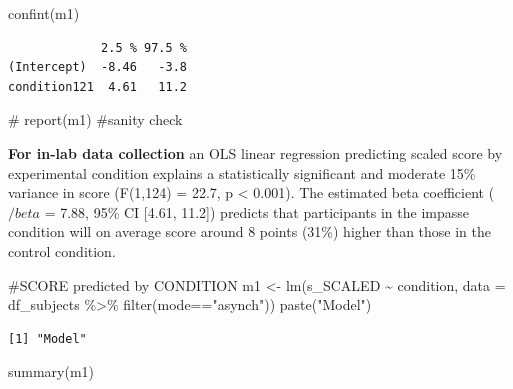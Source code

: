 \documentclass[
  letterpaper,
  DIV=11,
  numbers=noendperiod]{scrreprt}
\newenvironment{Shaded}{\begin{snugshade}}{\end{snugshade}}
\newcommand{\AttributeTok}[1]{\textcolor[rgb]{0.40,0.45,0.13}{#1}}
\newcommand{\CommentTok}[1]{\textcolor[rgb]{0.37,0.37,0.37}{#1}}
\newcommand{\FunctionTok}[1]{\textcolor[rgb]{0.28,0.35,0.67}{#1}}
\newcommand{\NormalTok}[1]{\textcolor[rgb]{0.00,0.23,0.31}{#1}}
\newcommand{\OtherTok}[1]{\textcolor[rgb]{0.00,0.23,0.31}{#1}}
\newcommand{\SpecialCharTok}[1]{\textcolor[rgb]{0.37,0.37,0.37}{#1}}
\newcommand{\StringTok}[1]{\textcolor[rgb]{0.13,0.47,0.30}{#1}}
\begin{document}
\begin{Shaded}
\begin{Highlighting}[]
\FunctionTok{confint}\NormalTok{(m1)}
\end{Highlighting}
\end{Shaded}

\begin{verbatim}
             2.5 % 97.5 %
(Intercept)  -8.46   -3.8
condition121  4.61   11.2
\end{verbatim}

\begin{Shaded}
\begin{Highlighting}[]
\CommentTok{\# report(m1) \#sanity check}
\end{Highlighting}
\end{Shaded}

\textbf{For in-lab data collection} an OLS linear regression predicting
scaled score by experimental condition explains a statistically
significant and moderate 15\% variance in score (F(1,124) = 22.7, p
\textless{} 0.001). The estimated beta coefficient (\(/beta\) = 7.88,
95\% CI {[}4.61, 11.2{]}) predicts that participants in the impasse
condition will on average score around 8 points (31\%) higher than those
in the control condition.

\begin{Shaded}
\begin{Highlighting}[]
\CommentTok{\#SCORE predicted by CONDITION}
\NormalTok{m1 }\OtherTok{\textless{}{-}} \FunctionTok{lm}\NormalTok{(s\_SCALED }\SpecialCharTok{\textasciitilde{}}\NormalTok{ condition, }\AttributeTok{data =}\NormalTok{ df\_subjects }\SpecialCharTok{\%\textgreater{}\%} \FunctionTok{filter}\NormalTok{(mode}\SpecialCharTok{==}\StringTok{"asynch"}\NormalTok{))}
\FunctionTok{paste}\NormalTok{(}\StringTok{"Model"}\NormalTok{)}
\end{Highlighting}
\end{Shaded}

\begin{verbatim}
[1] "Model"
\end{verbatim}

\begin{Shaded}
\begin{Highlighting}[]
\FunctionTok{summary}\NormalTok{(m1)}
\end{Highlighting}
\end{Shaded}
\end{document}
